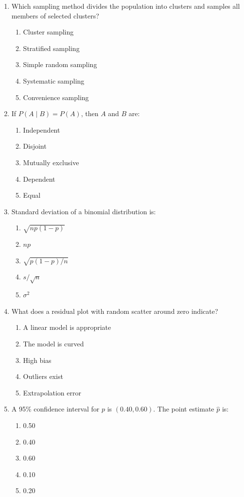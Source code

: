 \begin{enumerate}[resume, leftmargin=1.5em]
  \item Which sampling method divides the population into clusters and samples all members of selected clusters?
  \begin{enumerate}[label=(\Alph*)]
    \item Cluster sampling \item Stratified sampling \item Simple random sampling \item Systematic sampling \item Convenience sampling
  \end{enumerate}

  \item If $P(A \mid B) = P(A)$, then $A$ and $B$ are:
  \begin{enumerate}[label=(\Alph*)]
    \item Independent \item Disjoint \item Mutually exclusive \item Dependent \item Equal
  \end{enumerate}

  \item Standard deviation of a binomial distribution is:
  \begin{enumerate}[label=(\Alph*)]
    \item $\sqrt{np(1-p)}$ \item $np$ \item $\sqrt{p(1-p)/n}$ \item $s / \sqrt{n}$ \item $\sigma^2$
  \end{enumerate}

  \item What does a residual plot with random scatter around zero indicate?
  \begin{enumerate}[label=(\Alph*)]
    \item A linear model is appropriate \item The model is curved \item High bias \item Outliers exist \item Extrapolation error
  \end{enumerate}

  \item A 95\% confidence interval for $p$ is $(0.40, 0.60)$. The point estimate $\hat{p}$ is:
  \begin{enumerate}[label=(\Alph*)]
    \item 0.50 \item 0.40 \item 0.60 \item 0.10 \item 0.20
  \end{enumerate}


\end{enumerate}
